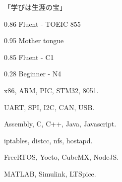 \documentclass{faresume}
\begin{document}
\begin{column}[\rightcolumnwidth]


        \addcontent
        {
            {\Large\begin{CJK}{UTF8}{min}「学びは生涯の宝」\end{CJK}}
        }{}{}{}{}


        {}{}{}{}

        {}{}{}{}

        {}{}{}{}

        {}{}{}{}

        {}{}{}{}


            {0.86}
            {Fluent - TOEIC 855}
            {}{}{}

            {0.95}
            {Mother tongue}
            {}{}{}

            {0.85}
            {Fluent - C1}
            {}{}{}

            {0.28}
            {Beginner - N4}
            {}{}{}


            {x86, ARM, PIC, STM32, 8051.}
            {}{}{}{}

            {UART, SPI, I2C, CAN, USB.}
            {}{}{}{}

            {Assembly, C, C++, Java, Javascript.}
            {}{}{}{}

            {iptables, distcc, nfs, hostapd.}
            {}{}{}{}

            {FreeRTOS, Yocto, CubeMX, NodeJS.}
            {}{}{}{}

            {MATLAB, Simulink, LTSpice.}
            {}{}{}{}


\end{column}
\end{document}
